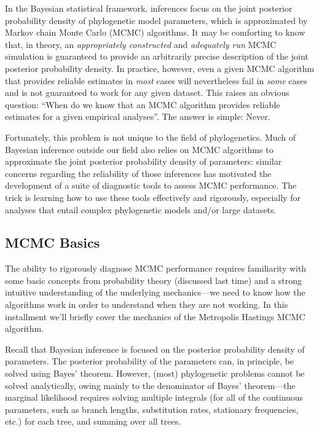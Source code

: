 \documentclass[11pt]{article}
\begin{document}
In the Bayesian statistical framework, inferences focus on the joint posterior probability density of phylogenetic model parameters, which is approximated by Markov chain Monte Carlo (MCMC) algorithms. It may be comforting to know that, in theory, an {\it appropriately constructed} and {\it adequately run} MCMC simulation is guaranteed to provide an arbitrarily precise description of the joint posterior probability density. In practice, however, even a given MCMC algorithm that provides reliable estimates in {\it most} cases will nevertheless fail in {\it some} cases and is not guaranteed to work for any given dataset. This raises an obvious question: ``When do we know that an MCMC algorithm provides reliable estimates for a given empirical analyses''. The answer is simple: Never.

Fortunately, this problem is not unique to the field of phylogenetics. Much of Bayesian inference outside our field also relies on MCMC algorithms to approximate the joint posterior probability density of parameters: similar concerns regarding the reliability of those inferences has motivated the development of a suite of diagnostic tools to assess MCMC performance. The trick is learning how to use these tools effectively and rigorously, especially for analyses that entail complex phylogenetic models and/or large datasets.

\bigskip
\subsection{MCMC Basics}

The ability to rigorously diagnose MCMC performance requires familiarity with some basic concepts from probability theory (discussed last time) and a strong intuitive understanding of the underlying mechanics---we need to know how the algorithms work in order to understand when they are not working. In this installment we’ll briefly cover the mechanics of the Metropolis Hastings MCMC algorithm.

Recall that Bayesian inference is focused on the posterior probability density of parameters.
The posterior probability of the parameters can, in principle, be solved using Bayes’ theorem.
However, (most) phylogenetic problems cannot be solved analytically, owing mainly to the denominator of Bayes’ theorem---the marginal likelihood requires solving multiple integrals (for all of the continuous parameters, such as branch lengths, substitution rates, stationary frequencies, etc.) for each tree, and summing over all trees.
\end{document}
